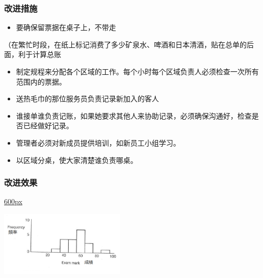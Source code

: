 \hypertarget{ux6539ux8fdbux63aaux65bd}{%
\subsubsection{改进措施}\label{ux6539ux8fdbux63aaux65bd}}

\begin{itemize}
\tightlist
\item
  要确保留票据在桌子上，不带走
\end{itemize}

（在繁忙时段，在纸上标记消费了多少矿泉水、啤酒和日本清酒，贴在总单的后面，利于计算总账

\begin{itemize}
\tightlist
\item
  制定规程来分配各个区域的工作。每个小时每个区域负责人必须检查一次所有范围内的票据。
\end{itemize}

\begin{itemize}
\tightlist
\item
  送热毛巾的那位服务员负责记录新加入的客人
\end{itemize}

\begin{itemize}
\tightlist
\item
  谁接单谁负责记账，如果她要求其他人来协助记录，必须确保沟通好，检查是否已经做好记录。
\end{itemize}

\begin{itemize}
\tightlist
\item
  管理者必须对新成员提供培训，如新员工小组学习。
\end{itemize}

\begin{itemize}
\tightlist
\item
  以区域分桌，使大家清楚谁负责哪桌。
\end{itemize}

\hypertarget{ux6539ux8fdbux6548ux679c}{%
\subsubsection{改进效果}\label{ux6539ux8fdbux6548ux679c}}

\href{文件:club19.1.jpg}{600px}

\includegraphics[width=6cm]{MA_FA1_10.png}

